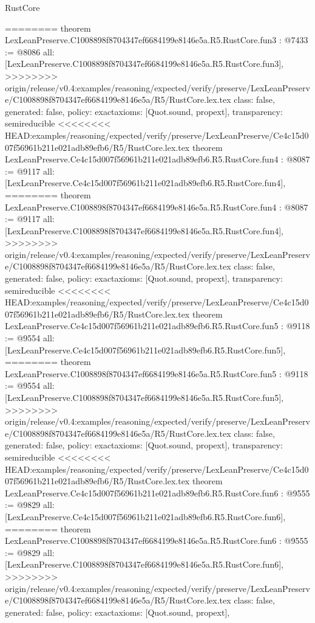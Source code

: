 \begin{lexlean}{RustCore}
\begin{coremodule}
{\begin{coremodule}
{{{{{{========
theorem LexLeanPreserve.C1008898f8704347ef6684199e8146e5a.R5.RustCore.fun3 : @7433 := @8086 {
  all: [LexLeanPreserve.C1008898f8704347ef6684199e8146e5a.R5.RustCore.fun3],
>>>>>>>> origin/release/v0.4:examples/reasoning/expected/verify/preserve/LexLeanPreserve/C1008898f8704347ef6684199e8146e5a/R5/RustCore.lex.tex
  class: false,
  generated: false,
  policy: exact{axioms: [Quot.sound, propext]},
  transparency: semireducible
}
<<<<<<<< HEAD:examples/reasoning/expected/verify/preserve/LexLeanPreserve/Ce4c15d007f56961b211e021adb89efb6/R5/RustCore.lex.tex
theorem LexLeanPreserve.Ce4c15d007f56961b211e021adb89efb6.R5.RustCore.fun4 : @8087 := @9117 {
  all: [LexLeanPreserve.Ce4c15d007f56961b211e021adb89efb6.R5.RustCore.fun4],
========
theorem LexLeanPreserve.C1008898f8704347ef6684199e8146e5a.R5.RustCore.fun4 : @8087 := @9117 {
  all: [LexLeanPreserve.C1008898f8704347ef6684199e8146e5a.R5.RustCore.fun4],
>>>>>>>> origin/release/v0.4:examples/reasoning/expected/verify/preserve/LexLeanPreserve/C1008898f8704347ef6684199e8146e5a/R5/RustCore.lex.tex
  class: false,
  generated: false,
  policy: exact{axioms: [Quot.sound, propext]},
  transparency: semireducible
}
<<<<<<<< HEAD:examples/reasoning/expected/verify/preserve/LexLeanPreserve/Ce4c15d007f56961b211e021adb89efb6/R5/RustCore.lex.tex
theorem LexLeanPreserve.Ce4c15d007f56961b211e021adb89efb6.R5.RustCore.fun5 : @9118 := @9554 {
  all: [LexLeanPreserve.Ce4c15d007f56961b211e021adb89efb6.R5.RustCore.fun5],
========
theorem LexLeanPreserve.C1008898f8704347ef6684199e8146e5a.R5.RustCore.fun5 : @9118 := @9554 {
  all: [LexLeanPreserve.C1008898f8704347ef6684199e8146e5a.R5.RustCore.fun5],
>>>>>>>> origin/release/v0.4:examples/reasoning/expected/verify/preserve/LexLeanPreserve/C1008898f8704347ef6684199e8146e5a/R5/RustCore.lex.tex
  class: false,
  generated: false,
  policy: exact{axioms: [Quot.sound, propext]},
  transparency: semireducible
}
<<<<<<<< HEAD:examples/reasoning/expected/verify/preserve/LexLeanPreserve/Ce4c15d007f56961b211e021adb89efb6/R5/RustCore.lex.tex
theorem LexLeanPreserve.Ce4c15d007f56961b211e021adb89efb6.R5.RustCore.fun6 : @9555 := @9829 {
  all: [LexLeanPreserve.Ce4c15d007f56961b211e021adb89efb6.R5.RustCore.fun6],
========
theorem LexLeanPreserve.C1008898f8704347ef6684199e8146e5a.R5.RustCore.fun6 : @9555 := @9829 {
  all: [LexLeanPreserve.C1008898f8704347ef6684199e8146e5a.R5.RustCore.fun6],
>>>>>>>> origin/release/v0.4:examples/reasoning/expected/verify/preserve/LexLeanPreserve/C1008898f8704347ef6684199e8146e5a/R5/RustCore.lex.tex
  class: false,
  generated: false,
  policy: exact{axioms: [Quot.sound, propext]},
}}}}}}}}}}
\end{coremodule}}
\end{coremodule}
\end{lexlean}
